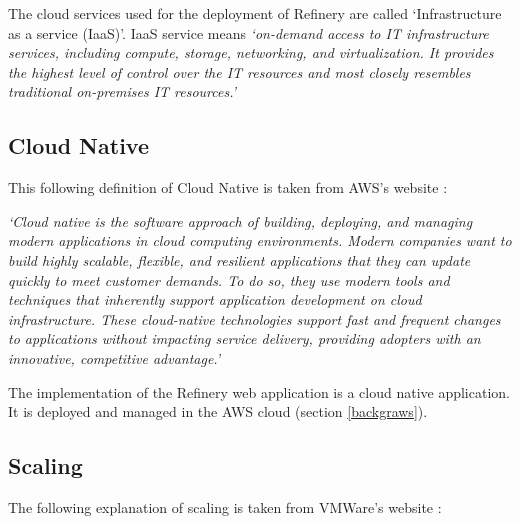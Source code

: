 	The cloud services used for the deployment of Refinery are called `Infrastructure as a service (IaaS)'.
	IaaS service means \textit{`on-demand access to IT infrastructure services, 
		including compute, storage, networking, and virtualization. It provides the highest level of control over the IT 
		resources and most closely resembles traditional on-premises IT resources.' \cite{cloud} }

	\subsection{Cloud Native} \label{backgrcloudnative}
		This following definition of Cloud Native is taken from AWS's website \cite{cloudnative}:

		\textit{
			`Cloud native is the software approach of building, deploying, and managing modern applications 
			in cloud computing environments. Modern companies want to build highly scalable, flexible, and 
			resilient applications that they can update quickly to meet customer demands. 
			To do so, they use modern tools and techniques that inherently support application
			development on cloud infrastructure. These cloud-native technologies support fast 
			and frequent changes to applications without impacting service delivery, providing
			adopters with an innovative, competitive advantage.'
		}

		The implementation of the Refinery web application is a cloud native application. It is deployed 
		and managed in the AWS cloud (section \ref{backgraws}).

	\subsection{Scaling} \label{backgrscaling}
		The following explanation of scaling is taken from VMWare's website \cite{scaling}:

